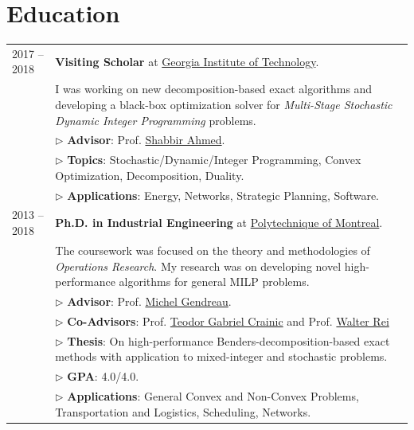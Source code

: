 \documentclass[10PT,letter]{article}
\newcommand{\numbox}[1]{} %
\begin{document}
\section*{\numbox{2}\bfseries\textcolor{titlecol}{\sffamily Education}}
        \begin{tabular}{lp{5.5in}}
	            \textsc{2017 -- 2018} & \textbf{Visiting Scholar} at \href{https://www.isye.gatech.edu}{Georgia Institute of Technology}.
	            \\[.5mm]
	            &  I was working on   new decomposition-based exact algorithms and  developing a black-box optimization solver for  \textit{Multi-Stage Stochastic Dynamic Integer Programming} problems.\\[.5mm]
	            & $\triangleright$ {\small\textbf{Advisor}}:  Prof. \href{https://www2.isye.gatech.edu/people/faculty/Shabbir_Ahmed/}{Shabbir Ahmed}.\\[1.1mm]
	            & $\triangleright$ {\small\textbf{Topics}}: Stochastic/Dynamic/Integer Programming, Convex Optimization, Decomposition, Duality.\\
	            & $\triangleright$ {\small\textbf{Applications}}: Energy, Networks, Strategic Planning,  Software.\\[4mm]
	            \textsc{2013 -- 2018} & \textbf{Ph.D. in Industrial Engineering} at \href{https://www.polymtl.ca/magi/}{Polytechnique of Montreal}.\\[.5mm]
	            & The coursework was   focused on the  theory and methodologies of \textit{Operations Research}. My research was  on developing novel high-performance algorithms for general MILP problems.\\[.5mm]
	            & $\triangleright$ {\small\textbf{Advisor}}:  Prof. \href{https://www.polymtl.ca/expertises/en/gendreau-michel}{Michel Gendreau}.\\[1.1mm]
	            & $\triangleright$ {\small\textbf{Co-Advisors}}:  Prof. \href{https://professeurs.uqam.ca/professeur?c=crainic.teodor}{Teodor Gabriel Crainic} and Prof. \href{https://professeurs.uqam.ca/professeur?c=rei.walter}{Walter Rei} \\[1.1mm]
	            & $\triangleright$ {\small\textbf{Thesis}}: On high-performance Benders-decomposition-based exact methods with application to mixed-integer and stochastic problems.\\
	            & $\triangleright$ {\small\textbf{GPA}}: 4.0/4.0.\\
	            & $\triangleright$ {\small\textbf{Applications}}: General Convex and Non-Convex Problems, Transportation and Logistics, Scheduling, Networks.\\[4mm]

\end{tabular}
\end{document}
